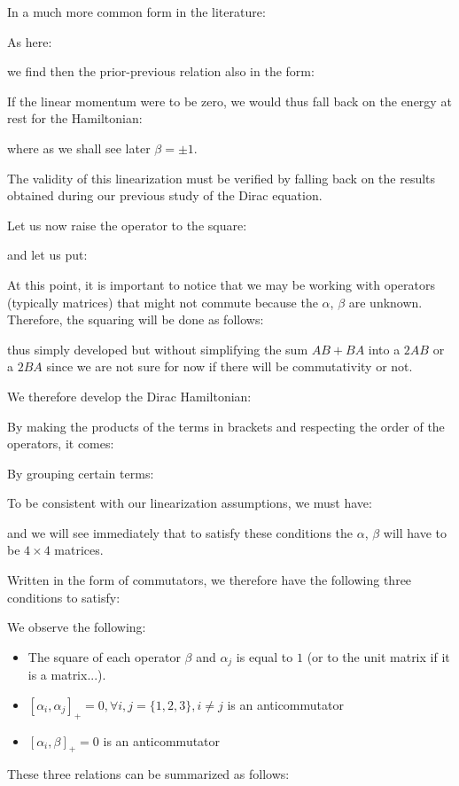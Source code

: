 	In a much more common form in the literature:
	
	As here:
	
	we find then the prior-previous relation also in the form:
	
	If the linear momentum were to be zero, we would thus fall back on the energy at rest for the Hamiltonian:
	
	where as we shall see later $\beta=\pm 1$.
	
	The validity of this linearization must be verified by falling back on the results obtained during our previous study of the Dirac equation.

	Let us now raise the operator to the square:
	
	and let us put:
	
	At this point, it is important to notice that we may be working with operators (typically matrices) that might not commute because the $\alpha$, $\beta$ are unknown. Therefore, the squaring will be done as follows:
	
	thus simply developed but without simplifying the sum $AB + BA$ into a $2AB$ or a $2BA$ since we are not sure for now if there will be commutativity or not.

	We therefore develop the Dirac Hamiltonian:
	
	By making the products of the terms in brackets and respecting the order of the operators, it comes:
	
	By grouping certain terms:
	
	To be consistent with our linearization assumptions, we must have:
	
	and we will see immediately that to satisfy these conditions the $\alpha$, $\beta$ will have to be $4\times 4$ matrices.

	Written in the form of commutators, we therefore have the following three conditions to satisfy:
	
	We observe the following:
	\begin{itemize}
		\item The square of each operator $\beta$ and $\alpha_j$ is equal to $1$ (or to the unit matrix if it is a matrix...).

		\item $\left[\alpha_i,\alpha_j\right]_{+}=0,\forall i,j=\{1,2,3\},i\neq j$ is an anticommutator

		\item $\left[\alpha_i,\beta\right]_{+}=0$ is an anticommutator
	\end{itemize}
	These three relations can be summarized as follows:
	

